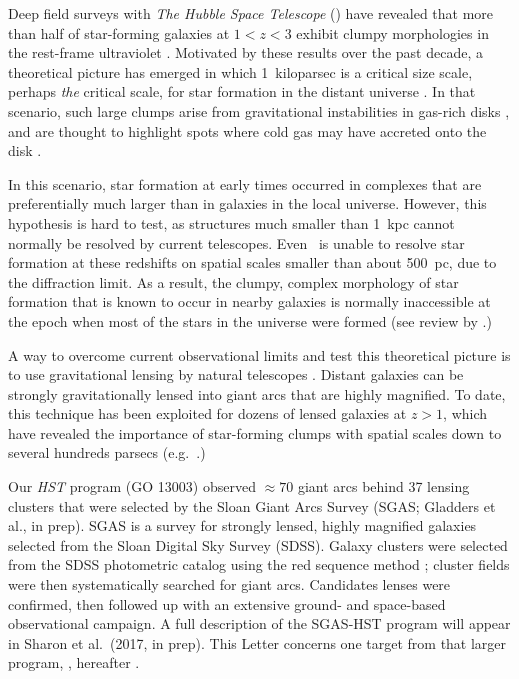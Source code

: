 Deep field surveys with \textit{The Hubble Space Telescope}  (\hst) 
have revealed that more than half of star-forming galaxies 
at $1< z < 3$ exhibit clumpy morphologies in the rest-frame 
ultraviolet \citep{Shibuya:2016}.  Motivated by these  results over 
the past decade,  a theoretical picture has emerged in which 
1~kiloparsec is a critical size scale, perhaps {\it the} critical scale, for 
star formation in the distant universe 
\citep{Elmegreen:2005fv, Elmegreen:2007id, Elmegreen:2009kd, ForsterSchreiber:2011by, 
Guo:2011cn, Guo:2015dr}.  
In that scenario, such large clumps arise from gravitational instabilities in gas-rich disks 
\citep{Toomre:1964fe, Noguchi:1999gm, Genzel:2011cp},
and are thought to highlight spots where cold gas may have accreted onto the disk 
\citep{Keres:2005gb, Dekel:2006cn, Brooks:2009bm}.

In this scenario, star formation at early times occurred in complexes that are preferentially much larger 
than in galaxies in the local universe.  
However, this hypothesis is hard to test, as structures much smaller than 1~kpc cannot 
normally be resolved by current telescopes.  
Even \hst\ is unable to  resolve star formation  at these redshifts on spatial 
scales smaller than about 500~pc, due to the diffraction limit.  
As a result,  the clumpy, 
complex morphology of star formation that is known to occur 
in nearby galaxies is normally inaccessible at the epoch when 
most of the stars in the universe were formed (see review by \citealt{Madau:2014gt}.) 

A way to overcome current observational limits and test this theoretical picture is to use
gravitational lensing by natural telescopes \citep{Einstein:1936jq, Zwicky:1937dm}.
Distant galaxies can be strongly gravitationally lensed into giant arcs that are highly magnified.  
To date, this technique has been exploited for dozens of lensed galaxies at 
$z>1$, which have revealed the importance of star-forming clumps with spatial 
scales down to several hundreds parsecs (e.g.~\citealt{Livermore:2012gw, Jones:2010hp}.)

Our \textit{HST} program (GO 13003) observed 
$\approx 70$ giant arcs behind 
37 lensing clusters that were selected by the 
Sloan Giant Arcs Survey (SGAS; Gladders et al., in prep).  
SGAS is a survey for strongly lensed, highly magnified galaxies selected from 
the Sloan Digital Sky Survey (SDSS).  
Galaxy clusters were selected from the SDSS photometric catalog using the 
red sequence method \citep{Gladders:2000ca}; cluster fields were 
then systematically searched for giant arcs.
Candidates lenses were confirmed, then followed up with an extensive
ground- and space-based observational campaign.
A full description of the SGAS-HST program will appear in Sharon et al.\ (2017, in prep). 
This Letter concerns one target from that larger program, \giantarc, hereafter \arcname.

